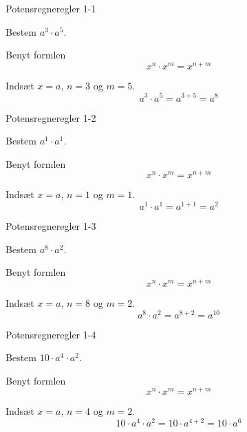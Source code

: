 \documentclass{article}
\begin{document}
\tableofcontents
\newpage

\begin{exercise}{Potensregneregler 1-1}

Bestem $a^3 \cdot a^5$.


\hint

Benyt formlen
\[
x^n \cdot x^m = x^{n+m}
\]

\hint

Indsæt $x=a$, $n=3$ og $m=5$.
\[
a^3 \cdot a^5 = a^{3+5} = a^8
\]

\end{exercise}

\newpage

\begin{exercise}{Potensregneregler 1-2}
	
	Bestem $a^1 \cdot a^1$.
	
	
	\hint
	
	Benyt formlen
	\[
	x^n \cdot x^m = x^{n+m}
	\]
	
	\hint
	
	Indsæt $x=a$, $n=1$ og $m=1$.
	\[
	a^1 \cdot a^1 = a^{1+1} = a^2
	\]
	
\end{exercise}

\newpage

\begin{exercise}{Potensregneregler 1-3}
	
	Bestem $a^8 \cdot a^2$.
	
	
	\hint
	
	Benyt formlen
	\[
	x^n \cdot x^m = x^{n+m}
	\]
	
	\hint
	
	Indsæt $x=a$, $n=8$ og $m=2$.
	\[
	a^8 \cdot a^2 = a^{8+2} = a^{10}
	\]
	
\end{exercise}

\newpage

\begin{exercise}{Potensregneregler 1-4}
	
	Bestem $10 \cdot a^4 \cdot a^2$.
	
	
	\hint
	
	Benyt formlen
	\[
	x^n \cdot x^m = x^{n+m}
	\]
	
	\hint
	
	Indsæt $x=a$, $n=4$ og $m=2$.
	\[
	10 \cdot a^4 \cdot a^2 = 10 \cdot a^{4+2} =  10 \cdot a^6
	\]
	
\end{exercise}
\end{document}
